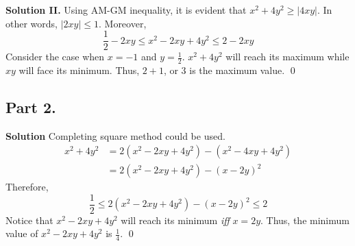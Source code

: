 \documentclass{article}
\newenvironment{solution}{\begin{trivlist}\item[]{\bf Solution}}{\qed \end{trivlist}}
\begin{document}
\textbf{Solution II.} Using AM-GM inequality, it is evident
that $x^2 + 4y^2 \geq |4xy|$. In other words, $|2xy| \leq 1$.
Moreover,
\[
\frac{1}{2} - 2xy \leq x^2 - 2xy + 4y^2 \leq 2 - 2xy
\]
Consider the case when $x = -1$ and $y = \frac{1}{2}$.
$x^2 + 4y^2$ will reach its maximum while $xy$ will face its
minimum. Thus, $2 + 1$, or $\boxed{3}$ is the maximum value.
\qed

\subsection*{Part 2.}
\begin{solution}
Completing square method could be used.
\begin{align*}
    x^2 + 4y^2
    &= 2 \left( x^2 - 2xy + 4y^2 \right) - (x^2 - 4xy + 4y^2) \\
    &= 2 \left( x^2 - 2xy + 4y^2 \right) - (x - 2y)^2
\end{align*}
Therefore,
\[
\frac{1}{2} \leq 2 \left( x^2 - 2xy + 4y^2 \right) - (x - 2y)^2 \leq 2
\]
Notice that $x^2 - 2xy + 4y^2$ will reach its minimum
\textit{iff} $x = 2y$. Thus, the minimum value of
$x^2 - 2xy + 4y^2$ is $\boxed{\frac{1}{4}}$.
\end{solution}
\end{document}
